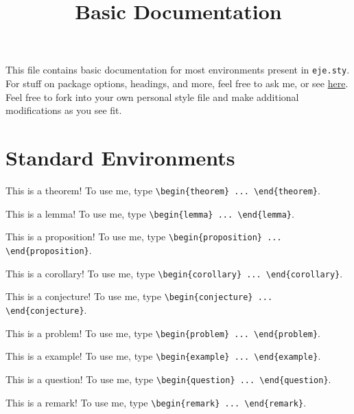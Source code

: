 \documentclass{scrartcl}
\title{Basic Documentation}
\begin{document}
\maketitle

This file contains basic documentation for most environments present in \verb#eje.sty#. For stuff on package options, headings, and more, feel free to ask me, or see \href{https://github.com/eje24/style}{here}. Feel free to fork into your own personal style file and make additional modifications as you see fit.

\tableofcontents


\section{Standard Environments}
\begin{theorem}
    This is a theorem!  To use me, type \verb#\begin{theorem} ... \end{theorem}#.
\end{theorem}
\begin{lemma}
    This is a lemma!  To use me, type \verb#\begin{lemma} ... \end{lemma}#.
\end{lemma}
\begin{proposition}
    This is a proposition! To use me, type \verb#\begin{proposition} ... \end{proposition}#.
\end{proposition}
\begin{corollary}
    This is a corollary! To use me, type \verb#\begin{corollary} ... \end{corollary}#.
\end{corollary}
\begin{conjecture}
    This is a conjecture! To use me, type \verb#\begin{conjecture} ... \end{conjecture}#.
\end{conjecture}
\begin{problem}
    This is a problem! To use me, type \verb#\begin{problem} ... \end{problem}#.
\end{problem}
\begin{example}
    This is a example! To use me, type \verb#\begin{example} ... \end{example}#.
\end{example}
\begin{question}
    This is a question! To use me, type \verb#\begin{question} ... \end{question}#.
\end{question}
\begin{remark}
    This is a remark! To use me, type \verb#\begin{remark} ... \end{remark}#.
\end{remark}
\end{document}
